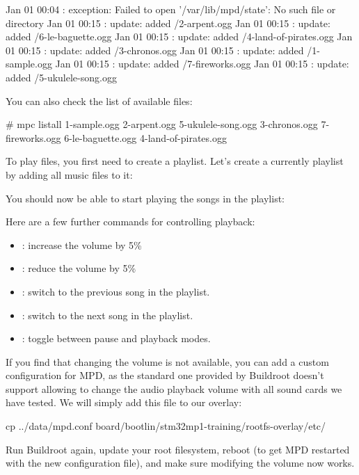 \begin{terminaloutput}
Jan 01 00:04 : exception: Failed to open '/var/lib/mpd/state': No such file or directory
Jan 01 00:15 : update: added /2-arpent.ogg
Jan 01 00:15 : update: added /6-le-baguette.ogg
Jan 01 00:15 : update: added /4-land-of-pirates.ogg
Jan 01 00:15 : update: added /3-chronos.ogg
Jan 01 00:15 : update: added /1-sample.ogg
Jan 01 00:15 : update: added /7-fireworks.ogg
Jan 01 00:15 : update: added /5-ukulele-song.ogg
\end{terminaloutput}

You can also check the list of available files:
\begin{terminaloutput}
# mpc listall
1-sample.ogg
2-arpent.ogg
5-ukulele-song.ogg
3-chronos.ogg
7-fireworks.ogg
6-le-baguette.ogg
4-land-of-pirates.ogg
\end{terminaloutput}

To play files, you first need to create a playlist. Let's create a
currently playlist by adding all music files to it:


You should now be able to start playing the songs in the playlist:


Here are a few further commands for controlling playback:
\begin{itemize}
\item {}: increase the volume by 5\%
\item {}: reduce the volume by 5\%
\item {}: switch to the previous song in the playlist.
\item {}: switch to the next song in the playlist.
\item {}: toggle between pause and playback modes.
\end{itemize}

If you find that changing the volume is not available, you can
add a custom configuration for MPD, as the standard one
provided by Buildroot doesn't support allowing to change the audio
playback volume with all sound cards we have tested. We will simply
add this file to our overlay:

\begin{bashinput}
cp ../data/mpd.conf board/bootlin/stm32mp1-training/rootfs-overlay/etc/
\end{bashinput}

Run Buildroot again, update your root filesystem, reboot (to get MPD
restarted with the new configuration file), and make sure modifying
the volume now works.

